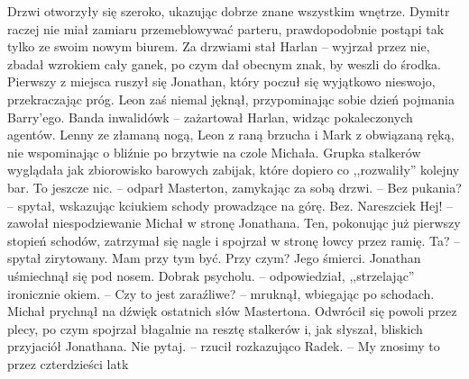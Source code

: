 \documentclass[../MAIN.tex]{subfiles}
\begin{document}
Drzwi otworzyły się szeroko, ukazując dobrze znane wszystkim wnętrze. Dymitr raczej nie miał zamiaru przemeblowywać parteru, prawdopodobnie postąpi tak tylko ze swoim nowym biurem.
Za drzwiami stał Harlan -- wyjrzał przez nie, zbadał wzrokiem cały ganek, po czym dał obecnym znak, by weszli do środka. Pierwszy z miejsca ruszył się Jonathan, który poczuł się wyjątkowo nieswojo, przekraczając próg. Leon zaś niemal jęknął, przypominając sobie dzień pojmania Barry'ego.
\sx Banda inwalidów\3k -- zażartował Harlan, widząc pokaleczonych agentów.
\qd
Lenny ze złamaną nogą, Leon z raną brzucha i Mark z obwiązaną ręką, nie wspominając o bliźnie po brzytwie na czole Michała. Grupka stalkerów wyglądała jak zbiorowisko barowych zabijak, które dopiero co ,,rozwaliły'' kolejny bar.
\sx To jeszcze nic. -- odparł Masterton, zamykając za sobą drzwi. -- Bez pukania? -- spytał, wskazując kciukiem schody prowadzące na górę.
\xx Bez.
\xx Nareszcie\3k
\xx Hej! -- zawołał niespodziewanie Michał w stronę Jonathana. Ten, pokonując już pierwszy stopień schodów, zatrzymał się nagle i spojrzał w stronę łowcy przez ramię.
\xx Ta? -- spytał zirytowany.
\xx Mam przy tym być.
\xx Przy czym?
\xx Jego śmierci.
\qd
Jonathan uśmiechnął się pod nosem.
\sx Dobra\3k psycholu. -- odpowiedział, ,,strzelając'' ironicznie okiem. -- Czy to jest zaraźliwe? -- mruknął, wbiegając po schodach.
\qd
Michał prychnął na dźwięk ostatnich słów Mastertona. Odwrócił się powoli przez plecy, po czym spojrzał błagalnie na resztę stalkerów i, jak słyszał, bliskich przyjaciół Jonathana.
\sx Nie pytaj. -- rzucił rozkazująco Radek. -- My znosimy to przez czterdzieści lat\3k
\qd
\end{document}
